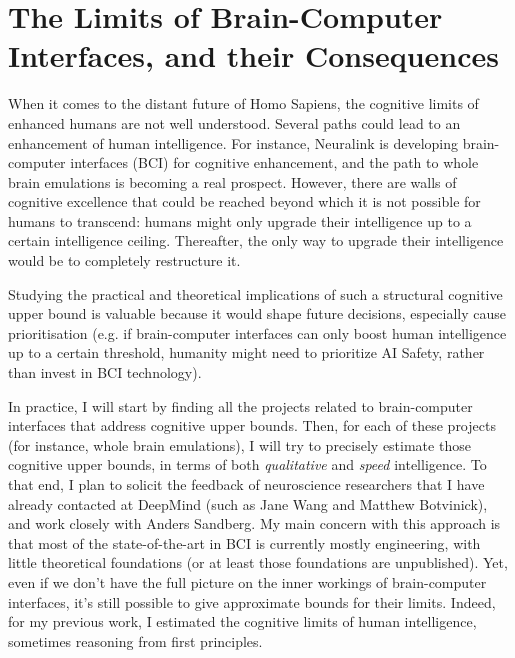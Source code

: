 \documentclass{article}
\begin{document}
\section*{The Limits of Brain-Computer Interfaces, and their Consequences}

When it comes to the distant future of Homo Sapiens, the cognitive limits of enhanced humans are not well understood. Several paths could lead to an enhancement of human intelligence. For instance, Neuralink is developing brain-computer interfaces (BCI) for cognitive enhancement, and the path to whole brain emulations is becoming a real prospect\cite{waitbutwhy2017}\cite{sandberg2013feasibility}\cite{sandberg2008whole}. However, there are walls of cognitive excellence that could be reached beyond which it is not possible for humans to transcend: humans might only upgrade their intelligence up to a certain intelligence ceiling. Thereafter, the only way to upgrade their intelligence would be to completely restructure it.

Studying the practical and theoretical implications of such a structural cognitive upper bound is valuable because it would shape future decisions, especially cause prioritisation (e.g. if brain-computer interfaces can only boost human intelligence up to a certain threshold, humanity might need to prioritize AI Safety, rather than invest in BCI technology).

In practice, I will start by finding all the projects related to brain-computer interfaces that address cognitive upper bounds. Then, for each of these projects (for instance, whole brain emulations), I will try to precisely estimate those cognitive upper bounds, in terms of both \textit{qualitative} and \textit{speed} intelligence\cite{Bostrom2014}. To that end, I plan to solicit the feedback of neuroscience researchers that I have already contacted at DeepMind (such as Jane Wang and Matthew Botvinick), and work closely with Anders Sandberg. My main concern with this approach is that most of the state-of-the-art in BCI is currently mostly engineering, with little theoretical foundations (or at least those foundations are unpublished). Yet, even if we don't have the full picture on the inner workings of brain-computer interfaces, it's still possible to give approximate bounds for their limits. Indeed, for my previous work\cite{Trazzi2018stupidity}, I estimated the cognitive limits of human intelligence, sometimes reasoning from first principles. 

\printbibliography
\end{document}
